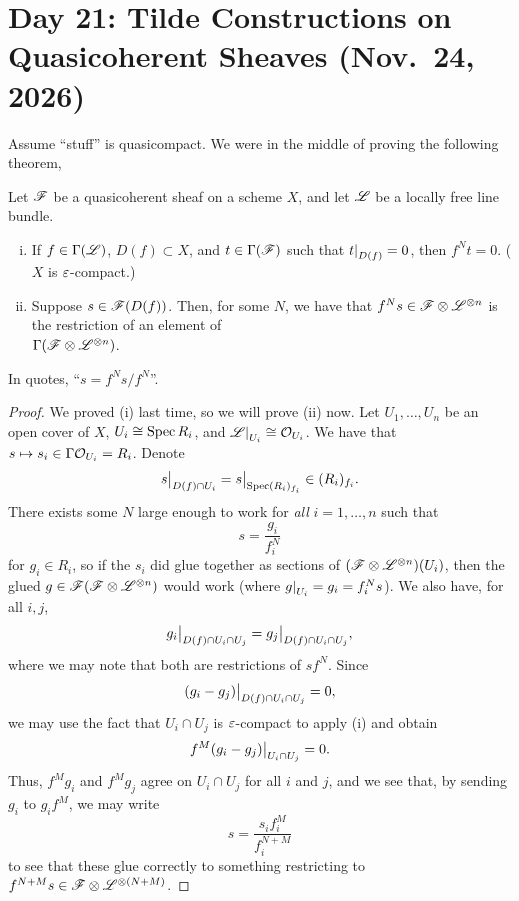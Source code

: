 \section{Day 21: Tilde Constructions on Quasicoherent Sheaves (Nov.\ 24, 2026)}
Assume ``stuff'' is quasicompact. We were in the middle of proving the following theorem,
\begin{theorem} \label{thm:qcoh_sheaf_line_bundle_2}
    Let $\mathscr F$ be a quasicoherent sheaf on a scheme $X$, and let $\mathscr L$ be a locally free line bundle.
    \begin{enumerate}[(i)]
        \item If $f \in \Gamma(\mathscr L)$, $D(f) \subset X$, and $t \in \Gamma(\mathscr F)$ such that $\restr{t}{D(f)} = 0$, then $f^N t = 0$. {\color{amethyst}($X$ is $\varepsilon$-compact.)}
        \item Suppose $s \in \mathscr F(D(f))$. Then, for some $N$, we have that $f^N s \in \mathscr F \otimes \mathscr L^{\otimes n}$ is the restriction of an element of \\ $\Gamma (\mathscr F \otimes \mathscr L^{\otimes n})$. 
    \end{enumerate}
\end{theorem}
In quotes, ``$s = f^{N}s / f^N$''.
\begin{proof}
    We proved (i) last time, so we will prove (ii) now. Let $U_1, \dots, U_n$ be an open cover of $X$, $U_i \cong \operatorname{Spec} R_i$, and $\restr{\SCL}{U_i} \cong \SO_{U_i}$. We have that $s \mapsto s_i \in \Gamma \mathcal O_{U_i} = R_i$. Denote
    \[ \restr{s}{D(f) \cap U_i} = \restr{s}{\Spec(R_i)_{f_i}} \in (R_i)_{f_i}. \]
    There exists some $N$ large enough to work for \textit{all} $i = 1, \dots, n$ such that
    \[ s = \frac{g_i}{f_i^N} \]
    for $g_i \in R_i$, so if the $s_i$ did glue together as sections of $(\mathscr F \otimes \mathscr L^{\otimes n})(U_i)$, then the glued $g \in \mathscr F(\mathscr F \otimes \mathscr L^{\otimes n})$ would work {\color{amethyst}(where $\restr{g}{U_i} = g_i = f_i^N s$)}. We also have, for all $i, j$,
    \[ \restr{g_i}{D(f) \cap U_i \cap U_j} = \restr{g_j}{D(f) \cap U_i \cap U_j}, \]
    where we may note that both are restrictions of $sf^N$. Since
    \[ \restr{(g_i - g_j)}{D(f) \cap U_i \cap U_j} = 0, \]
    we may use the fact that $U_i \cap U_j$ is $\varepsilon$-compact to apply (i) and obtain
    \[ \restr{f^M(g_i - g_j)}{U_i \cap U_j} = 0. \]
    Thus, $f^M g_i$ and $f^M g_j$ agree on $U_i \cap U_j$ for all $i$ and $j$, and we see that, by sending $g_i$ to $g_i f^M$, we may write
    \[ s = \frac{s_i f_i^M}{f_i^{N + M}} \]
    to see that these glue correctly to something restricting to $f^{N+M} s \in \mathscr F \otimes \mathscr L^{\otimes(N + M)}$.
\end{proof}

